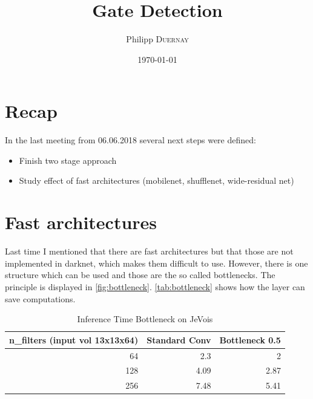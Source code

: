 \documentclass{article}
\title{Gate Detection} %
\author{Philipp \textsc{Duernay}} %
\date{\today} %
\begin{document}
\maketitle


\section{Recap}
In the last meeting from 06.06.2018 several next steps were defined:
\begin{itemize}
	\item Finish two stage approach
	\item Study effect of fast architectures (mobilenet, shufflenet, wide-residual net)
\end{itemize}


\section{Fast architectures}

Last time I mentioned that there are fast architectures but that those are not implemented in darknet, which makes them difficult to use. However, there is one structure which can be used and those are the so called bottlenecks. The principle is displayed in \autoref{fig:bottleneck}. \autoref{tab:bottleneck} shows how the layer can save computations.

\begin{table}[htbp]
	\caption{Inference Time Bottleneck on JeVois}
	\begin{center}
		\begin{tabular}{|r|r|r|}
			\hline
			\multicolumn{1}{|l|}{\textbf{n\_filters (input vol 13x13x64)}} & \multicolumn{1}{l|}{\textbf{Standard Conv}} & \multicolumn{1}{l|}{\textbf{Bottleneck 0.5}} \\ \hline
			64 & 2.3 & 2 \\ \hline
			128 & 4.09 & 2.87 \\ \hline
			256 & 7.48 & 5.41 \\ \hline
		\end{tabular}
	\end{center}
	\label{tab:bottleneck}
\end{table}
\end{document}
